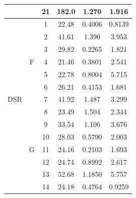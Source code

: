 \begin{linenumbers}
\begin{table}[htbp]
\begin{tabular}{cccccc}
          					&						& 21& 182.0	& 1.270	& 1.916	\\
    \midrule
    \multirow{13}{*}{DSR}& \multirow{7}{*}{F} & 1 & 22.48 & 0.4006 & 0.8139\\
    						&						& 2 & 41.61 & 1.390 & 3.953\\
    						&						& 3 & 29.82 & 0.2265 & 1.821\\
          					& 						& 4 & 21.46 & 0.3801 & 2.541\\
          					&						& 5 & 22.78 & 0.8004 & 5.715\\
          					&						& 6 & 26.21 & 0.4153 & 1.681\\
          					&						& 7 & 41.92 & 1.487 & 3.299\\ \cline{2-6}
          					& \multirow{7}[2]{*}{G} & 8 & 23.49 & 1.504 & 2.344\\
          					&						& 9 & 33.54 & 1.106 & 3.676\\
          					&						& 10& 28.03 & 0.5790 & 2.003\\
          					&						& 11& 24.16 & 0.2103 & 1.693\\
          					&						& 12& 24.74 & 0.8992 & 2.617\\
					        &						& 13& 52.68 & 1.1850 & 5.757\\
					        &						& 14& 24.18 & 0.4764 & 0.9259\\
    \bottomrule
    \end{tabular}
\end{table}


\end{linenumbers}
